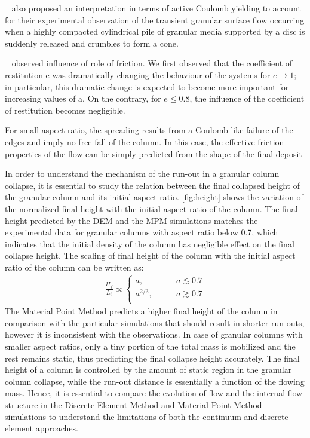 ~\citet{Daerr1999} also proposed an interpretation in terms
of active Coulomb yielding to account for their experimental
observation of the transient granular surface flow occurring
when a highly compacted cylindrical pile of granular media
supported by a disc is suddenly released and crumbles to
form a cone.

~\citet{Staron2006a} observed influence of role of friction. We first observed 
that the coefficient of restitution e was dramatically changing the behaviour 
of the systems for $e\longrightarrow 1$; in particular, this dramatic change is 
expected to become more important for increasing values of a. On the contrary, 
for $e \le 0.8$, the influence of the coefficient of restitution becomes 
negligible.

For small aspect ratio, the spreading results from a Coulomb-like
failure of the edges and imply no free fall of the column. In this case, the 
effective friction properties of the flow can be simply predicted from the 
shape of the final deposit

In order to understand the mechanism of the run-out in a granular column 
collapse, it is essential to study the relation between the final collapsed 
height of the granular column and its initial aspect ratio. 
\cref{fig:height} shows the variation of the normalized final height with 
the initial aspect ratio of the column. The final height predicted by the 
DEM and the MPM simulations matches the experimental data 
for 
granular columns with aspect ratio below 0.7, which indicates that the initial 
density of the column has negligible effect on the final collapse height. The 
scaling of final height of the column with the initial aspect ratio of the 
column can be written as:
\begin{align}
\frac{H_{\textit{f}}}{L_{\textit{i}}} \propto  
\begin{cases}
\textit{a}, \qquad & \textit{a}\lesssim0.7 \\
\textit{a}^{2/3}, \qquad & \textit{a}\gtrsim0.7 \\
\end{cases}
\end{align}
The Material Point Method predicts a higher final height of the column in 
comparison with the particular simulations that should result in shorter 
run-outs, however it is inconsistent with the observations. In case of granular 
columns with smaller aspect ratios, only a tiny portion of the total mass is 
mobilized and the rest remains static, thus predicting the final collapse 
height accurately. The final height of a column is controlled by the amount of 
static region in the granular column collapse, while the run-out distance is 
essentially a function of the flowing mass. Hence, it is essential to compare 
the evolution of flow and the internal flow structure in the Discrete Element 
Method 
and Material Point Method simulations to understand the limitations of both the 
continuum and discrete element approaches.


